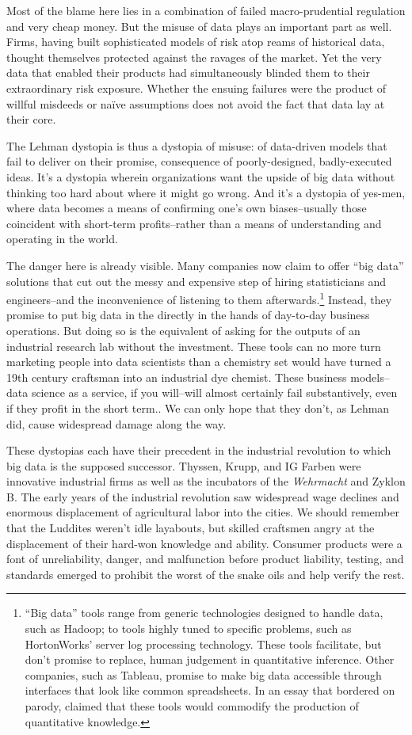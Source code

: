 \documentclass[12pt]{article}
\begin{document}
Most of the blame here lies in a combination of failed
macro-prudential regulation and very cheap money. But the misuse of
data plays an important part as well. Firms, having built
sophisticated models of risk atop reams of historical data, thought
themselves protected against the ravages of the market. Yet the very
data that enabled their products had simultaneously blinded them to
their extraordinary risk exposure. Whether the ensuing failures were the
product of willful misdeeds or na\"ive assumptions does not avoid the
fact that data lay at their core.

The Lehman dystopia is thus a dystopia of misuse: of data-driven
models that fail to deliver on their promise, consequence of
poorly-designed, badly-executed ideas. It's a dystopia wherein
organizations want the upside of big data without thinking too hard
about where it might go wrong. And it's a dystopia of yes-men, where
data becomes a means of confirming one's own biases--usually those
coincident with short-term profits--rather than a means of
understanding and operating in the world.

The danger here is already visible.  Many companies now claim to offer
``big data'' solutions that cut out the messy and expensive step of
hiring statisticians and engineers--and the inconvenience of listening
to them afterwards.\footnote{``Big data'' tools range from generic
technologies designed to handle data, such as Hadoop; to tools highly
tuned to specific problems, such as HortonWorks' server log processing
technology. These tools facilitate, but don't promise to replace,
human judgement in quantitative inference. Other companies, such as
Tableau, promise to make big data accessible through interfaces that
look like common spreadsheets. In an essay that bordered on parody,
\cite{mehta2013} claimed that these tools would commodify the
production of quantitative knowledge.} Instead, they promise to put
big data in the directly in the hands of day-to-day business
operations. But doing so is the equivalent of asking for the outputs
of an industrial research lab without the investment. These tools can
no more turn marketing people into data scientists than a chemistry
set would have turned a 19th century craftsman into an industrial dye
chemist. These business models--data science as a service, if you
will--will almost certainly fail substantively, even if they profit in
the short term.. We can only hope that they don't, as Lehman did,
cause widespread damage along the way.

These dystopias each have their precedent in the industrial revolution
to which big data is the supposed successor. Thyssen, Krupp, and IG
Farben were innovative industrial firms as well as the incubators of
the \textit{Wehrmacht} and Zyklon B. The early years of the industrial
revolution saw widespread wage declines and enormous displacement of
agricultural labor into the cities. We should remember that the
Luddites weren't idle layabouts, but skilled craftsmen angry at the
displacement of their hard-won knowledge and ability.  Consumer
products were a font of unreliability, danger, and malfunction before
product liability, testing, and standards emerged to prohibit the
worst of the snake oils and help verify the rest. 
\end{document}
